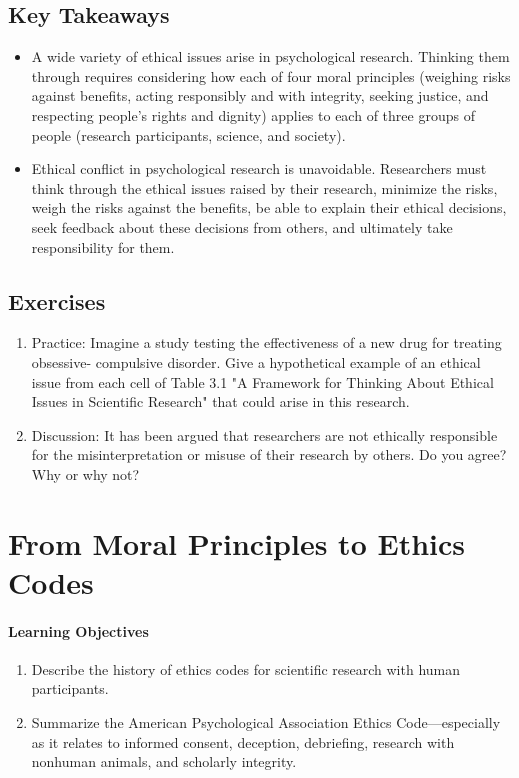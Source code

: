 \subsection{Key Takeaways}
\begin{fullwidth}
\begin{itemize}
\item A wide variety of ethical issues arise in psychological research. Thinking them through requires considering how each of four moral principles (weighing risks against benefits, acting responsibly and with integrity, seeking justice, and respecting people's rights and dignity) applies to each of three groups of people (research participants, science, and society).
\item Ethical conflict in psychological research is unavoidable. Researchers must think through the ethical issues raised by their research, minimize the risks, weigh the risks against the benefits, be able to explain their ethical decisions, seek feedback about these decisions from others, and ultimately take responsibility for them.
\end{itemize}
\end{fullwidth}

\subsection{Exercises}
\begin{fullwidth}
\begin{enumerate}
\item Practice: Imagine a study testing the effectiveness of a new drug for treating obsessive- compulsive disorder. Give a hypothetical example of an ethical issue from each cell of Table 3.1 "A Framework for Thinking About Ethical Issues in Scientific Research" that could arise in this research.
\item Discussion: It has been argued that researchers are not ethically responsible for the misinterpretation or misuse of their research by others. Do you agree? Why or why not?
\end{enumerate}
\end{fullwidth}

\newpage
\section{From Moral Principles to Ethics Codes}

 \paragraph{Learning Objectives}
 \begin{enumerate}
 \item Describe the history of ethics codes for scientific research with human participants.
\item Summarize the American Psychological Association Ethics Code---especially as it relates to informed consent, deception, debriefing, research with nonhuman animals, and scholarly integrity.

 \end{enumerate}



